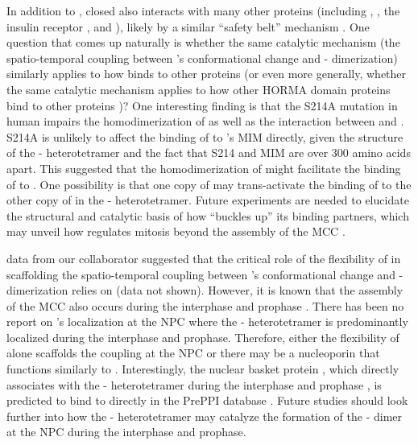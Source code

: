 In addition to , closed  also interacts with many other proteins (including ,  \cite{SGO2-MAD2}, the insulin receptor \cite{MCC_IREndocytosis}, and  \cite{KIF20A-MAD2}), likely by a similar ``safety belt'' mechanism \cite{Structure1GO4}. One question that comes up naturally is whether the same catalytic mechanism (the spatio-temporal coupling between 's conformational change and - dimerization) similarly applies to how  binds to other proteins (or even more generally, whether the same catalytic mechanism applies to how other HORMA domain proteins bind to other proteins \cite{HORMAReview})? One interesting finding is that the S214A mutation in human  impairs the homodimerization of  as well as the interaction between  and  \cite{ATMPhosphorylatesMad1S214}. S214A is unlikely to affect the binding of  to 's MIM directly, given the structure of the - heterotetramer \cite{Structure1GO4} and the fact that S214 and MIM are over 300 amino acids apart. This suggested that the homodimerization of  might facilitate the binding of  to . One possibility is that one copy of  may trans-activate the binding of  to the other copy of  in the - heterotetramer. Future experiments are needed to elucidate the structural and catalytic basis of how  ``buckles up'' its binding partners, which may unveil how  regulates mitosis beyond the assembly of the MCC \cite{Separase-SGO2-MAD2, KIF20A-MAD2}. %

 data from our collaborator suggested that the critical role of the flexibility of  in scaffolding the spatio-temporal coupling between 's conformational change and - dimerization relies on  (data not shown). However, it is known that the assembly of the MCC also occurs during the interphase and prophase \cite{PremitoticMCC}. There has been no report on 's localization at the NPC where the - heterotetramer is predominantly localized during the interphase and prophase. Therefore, either the flexibility of  alone scaffolds the coupling at the NPC or there may be a nucleoporin that functions similarly to . Interestingly, the nuclear basket protein , which directly associates with the - heterotetramer during the interphase and prophase \cite{TPR-MAD1_Lee2008}, is predicted to bind to  directly in the PrePPI database \cite{PrePPI}. Future studies should look further into how the - heterotetramer may catalyze the formation of the - dimer at the NPC during the interphase and prophase.

